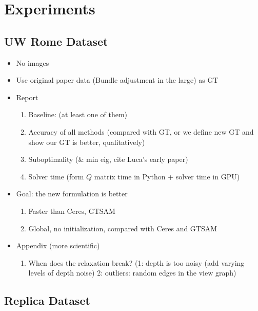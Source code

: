 
\section{Experiments}
\label{sec:exp}


\subsection{UW Rome Dataset}

\begin{itemize}
    \item No images
    
    \item Use original paper data (Bundle adjustment in the large) as GT
    
    \item Report
    \begin{enumerate}
        \item Baseline:  (at least one of them)
        \item Accuracy of all methods (compared with GT, or we define new GT and show our GT is better, qualitatively)
        \item Suboptimality (\& min eig, cite Luca's early paper)
        \item Solver time (form $Q$ matrix time in Python + \nameshort solver time in GPU)
    \end{enumerate}

    \item Goal: the new formulation is better 
    \begin{enumerate}
        \item Faster than Ceres, GTSAM 
        \item Global, no initialization, compared with Ceres and GTSAM
    \end{enumerate}

    
    \item Appendix (more scientific)
    \begin{enumerate}
        \item When does the relaxation break? (1: depth is too noisy (add varying levels of depth noise) 2: outliers: random edges in the view graph)
    \end{enumerate}
\end{itemize}


\subsection{Replica Dataset}

